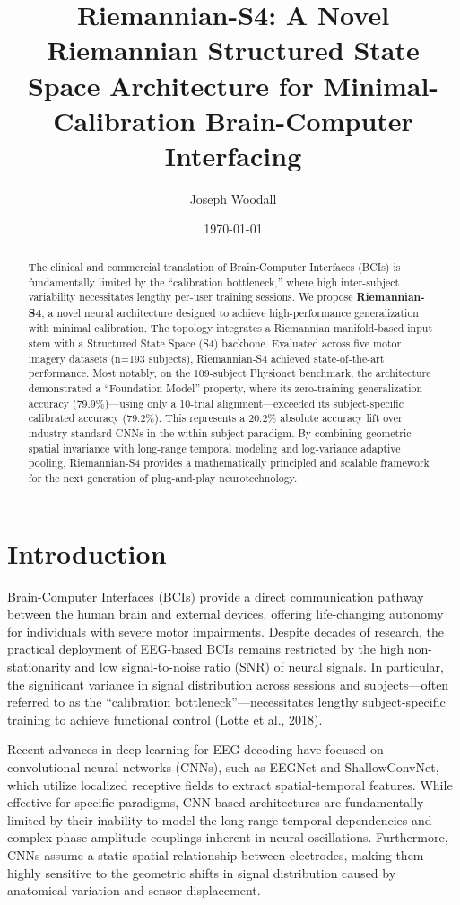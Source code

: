 \documentclass[11pt,a4paper]{article}
\title{\textbf{Riemannian-S4: A Novel Riemannian Structured State Space Architecture for Minimal-Calibration Brain-Computer Interfacing}}
\author[1]{Joseph Woodall}
\date{\today}
\begin{document}
\maketitle

\begin{abstract}
The clinical and commercial translation of Brain-Computer Interfaces (BCIs) is fundamentally limited by the ``calibration bottleneck,'' where high inter-subject variability necessitates lengthy per-user training sessions. We propose \textbf{Riemannian-S4}, a novel neural architecture designed to achieve high-performance generalization with minimal calibration. The topology integrates a Riemannian manifold-based input stem with a Structured State Space (S4) backbone. Evaluated across five motor imagery datasets (n=193 subjects), Riemannian-S4 achieved state-of-the-art performance. Most notably, on the 109-subject Physionet benchmark, the architecture demonstrated a ``Foundation Model'' property, where its zero-training generalization accuracy (79.9\%)---using only a 10-trial alignment---exceeded its subject-specific calibrated accuracy (79.2\%). This represents a 20.2\% absolute accuracy lift over industry-standard CNNs in the within-subject paradigm. By combining geometric spatial invariance with long-range temporal modeling and log-variance adaptive pooling, Riemannian-S4 provides a mathematically principled and scalable framework for the next generation of plug-and-play neurotechnology.
\end{abstract}

\section{Introduction}
Brain-Computer Interfaces (BCIs) provide a direct communication pathway between the human brain and external devices, offering life-changing autonomy for individuals with severe motor impairments. Despite decades of research, the practical deployment of EEG-based BCIs remains restricted by the high non-stationarity and low signal-to-noise ratio (SNR) of neural signals. In particular, the significant variance in signal distribution across sessions and subjects---often referred to as the ``calibration bottleneck''---necessitates lengthy subject-specific training to achieve functional control (Lotte et al., 2018).

Recent advances in deep learning for EEG decoding have focused on convolutional neural networks (CNNs), such as EEGNet and ShallowConvNet, which utilize localized receptive fields to extract spatial-temporal features. While effective for specific paradigms, CNN-based architectures are fundamentally limited by their inability to model the long-range temporal dependencies and complex phase-amplitude couplings inherent in neural oscillations. Furthermore, CNNs assume a static spatial relationship between electrodes, making them highly sensitive to the geometric shifts in signal distribution caused by anatomical variation and sensor displacement.
\end{document}
